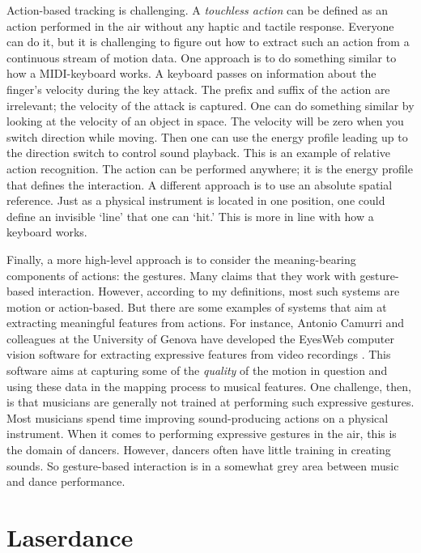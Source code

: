 Action-based tracking is challenging. A \emph{touchless action} can be defined as an action performed in the air without any haptic and tactile response. Everyone can do it, but it is challenging to figure out how to extract such an action from a continuous stream of motion data. One approach is to do something similar to how a MIDI-keyboard works. A keyboard passes on information about the finger's velocity during the key attack. The prefix and suffix of the action are irrelevant; the velocity of the attack is captured. One can do something similar by looking at the velocity of an object in space. The velocity will be zero when you switch direction while moving. Then one can use the energy profile leading up to the direction switch to control sound playback.  This is an example of relative action recognition. The action can be performed anywhere; it is the energy profile that defines the interaction. A different approach is to use an absolute spatial reference. Just as a physical instrument is located in one position, one could define an invisible `line' that one can `hit.' This is more in line with how a keyboard works.

Finally, a more high-level approach is to consider the meaning-bearing components of actions: the gestures. Many claims that they work with gesture-based interaction. However, according to my definitions, most such systems are motion or action-based. But there are some examples of systems that aim at extracting meaningful features from actions. For instance, Antonio Camurri and colleagues at the University of Genova have developed the EyesWeb computer vision software for extracting expressive features from video recordings \citep{camurri_tool_2005}. This software aims at capturing some of the \emph{quality} of the motion in question and using these data in the mapping process to musical features. One challenge, then, is that musicians are generally not trained at performing such expressive gestures. Most musicians spend time improving sound-producing actions on a physical instrument. When it comes to performing expressive gestures in the air, this is the domain of dancers. However, dancers often have little training in creating sounds. So gesture-based interaction is in a somewhat grey area between music and dance performance.


\section{Laserdance}\label{sec:laserdance}

